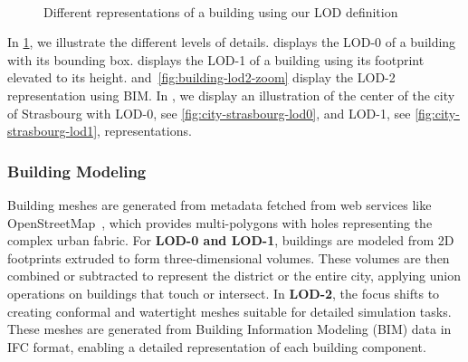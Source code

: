 \documentclass[runningheads]{llncs}
\begin{document}
\begin{figure}[ht]%
\centering
{}\hspace{0.05\linewidth}
\\ %

\hspace{0.05\linewidth}
{}

\caption{Different representations of a building using our LOD definition}
\label{fig:buildings}

\end{figure}

In \cref{fig:buildings}, we illustrate the different levels of details. 
 displays the LOD-0 of a building with its bounding box. 
 displays the LOD-1 of a building using its footprint elevated to its height. 
 and~\cref{fig:building-lod2-zoom} display the LOD-2 representation using BIM. 
In , we display an illustration of the center of the city of Strasbourg with LOD-0, see \cref{fig:city-strasbourg-lod0}, and LOD-1, see \cref{fig:city-strasbourg-lod1}, representations.




\subsubsection{Building Modeling}
Building meshes are generated from metadata fetched from web services like OpenStreetMap~\cite{openstreetmap_contributors_planet_2017}, which provides multi-polygons with holes representing the complex urban fabric. For \textbf{LOD-0 and LOD-1}, buildings are modeled from 2D footprints extruded to form three-dimensional volumes. These volumes are then combined or subtracted to represent the district or the entire city, applying union operations on buildings that touch or intersect. In \textbf{LOD-2}, the focus shifts to creating conformal and watertight meshes suitable for detailed simulation tasks. These meshes are generated from Building Information Modeling (BIM) data in IFC format, enabling a detailed representation of each building component.
\end{document}

